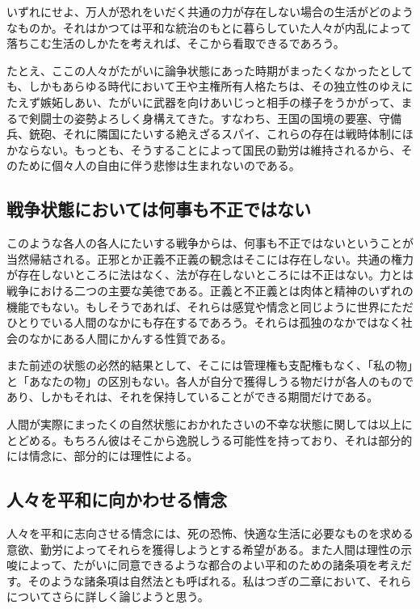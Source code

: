 いずれにせよ、万人が恐れをいだく共通の力が存在しない場合の生活がどのようなものか。それはかつては平和な統治のもとに暮らしていた人々が内乱によって落ちこむ生活のしかたを考えれば、そこから看取できるであろう。

たとえ、ここの人々がたがいに論争状態にあった時期がまったくなかったとしても、しかもあらゆる時代において王や主権所有人格たちは、その独立性のゆえにたえず嫉妬しあい、たがいに武器を向けあいじっと相手の様子をうかがって、まるで剣闘士の姿勢よろしく身構えてきた。すなわち、王国の国境の要塞、守備兵、銃砲、それに隣国にたいする絶えざるスパイ、これらの存在は戦時体制にほかならない。もっとも、そうすることによって国民の勤労は維持されるから、そのために個々人の自由に伴う悲惨は生まれないのである。


\subsection{戦争状態においては何事も不正ではない}

このような各人の各人にたいする戦争からは、何事も不正ではないということが当然帰結される。正邪とか正義不正義の観念はそこには存在しない。共通の権力が存在しないところに法はなく、法が存在しないところには不正はない。力とは戦争における二つの主要な美徳である。正義と不正義とは肉体と精神のいずれの機能でもない。もしそうであれば、それらは感覚や情念と同じように世界にただひとりでいる人間のなかにも存在するであろう。それらは孤独のなかではなく社会のなかにある人間にかんする性質である。


また前述の状態の必然的結果として、そこには管理権も支配権もなく、「私の物」と「あなたの物」の区別もない。各人が自分で獲得しうる物だけが各人のものであり、しかもそれは、それを保持していることができる期間だけである。



人間が実際にまったくの自然状態におかれたさいの不幸な状態に関しては以上にとどめる。もちろん彼はそこから逸脱しうる可能性を持っており、それは部分的には情念に、部分的には理性による。



\subsection{人々を平和に向かわせる情念}

人々を平和に志向させる情念には、死の恐怖、快適な生活に必要なものを求める意欲、勤労によってそれらを獲得しようとする希望がある。また人間は理性の示唆によって、たがいに同意できるような都合のよい平和のための諸条項を考えだす。そのような諸条項は自然法とも呼ばれる。私はつぎの二章において、それらについてさらに詳しく論じようと思う。




